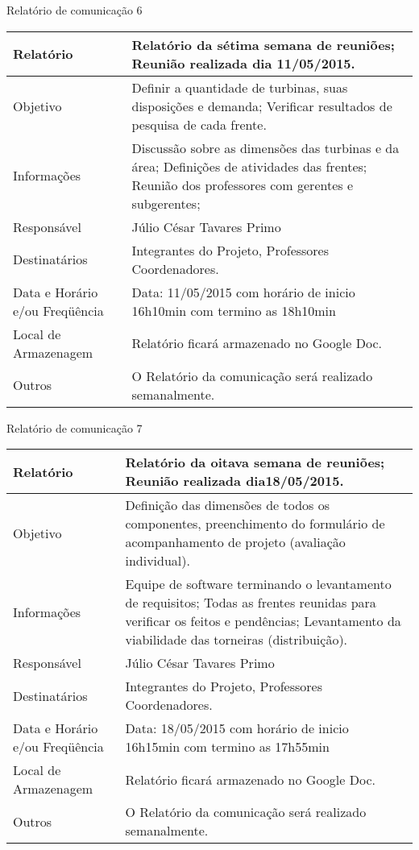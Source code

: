 \begin{center}
{\large Relatório de comunicação 6}
\begin{table}[h]
\begin{tabular}{|p{6cm}|p{9cm}|}\hline
Relatório&	Relatório da sétima semana de reuniões; Reunião realizada dia 11/05/2015.\\ \hline
Objetivo	&Definir a quantidade de turbinas, suas disposições e demanda; Verificar resultados de pesquisa de cada frente.\\ \hline
Informações&	Discussão sobre as dimensões das turbinas e da área; Definições de atividades das frentes; Reunião dos professores com gerentes e subgerentes;\\ \hline
Responsável &	Júlio César Tavares Primo\\ \hline
Destinatários&Integrantes do Projeto, Professores Coordenadores.\\ \hline
Data e Horário e/ou Freqüência	& Data: 11/05/2015 com horário de inicio 16h10min com termino as 18h10min\\ \hline
Local de Armazenagem&Relatório ficará armazenado no Google Doc.\\ \hline
Outros&O Relatório da comunicação será realizado semanalmente.\\ \hline

\end{tabular}
\end{table}
\FloatBarrier

{\large Relatório de comunicação 7}
\begin{table}[h]
\begin{tabular}{|p{6cm}|p{9cm}|}\hline
Relatório&Relatório da oitava semana de reuniões; Reunião realizada dia18/05/2015.\\ \hline
Objetivo&Definição das dimensões de todos os componentes, preenchimento do formulário de acompanhamento de projeto (avaliação individual).\\ \hline
Informações &	Equipe de software terminando o levantamento de requisitos;
Todas as frentes reunidas para verificar os feitos e pendências;
Levantamento da viabilidade das torneiras (distribuição).\\ \hline
Responsável	&Júlio César Tavares Primo\\ \hline
Destinatários	&Integrantes do Projeto, Professores Coordenadores.\\ \hline
Data e Horário e/ou Freqüência	& Data: 18/05/2015 com horário de inicio 16h15min com termino as 17h55min\\ \hline
Local de Armazenagem&Relatório ficará armazenado no Google Doc.\\ \hline
Outros&O Relatório da comunicação será realizado semanalmente.\\ \hline
\end{tabular}
\end{table}
\FloatBarrier



\end{center}

